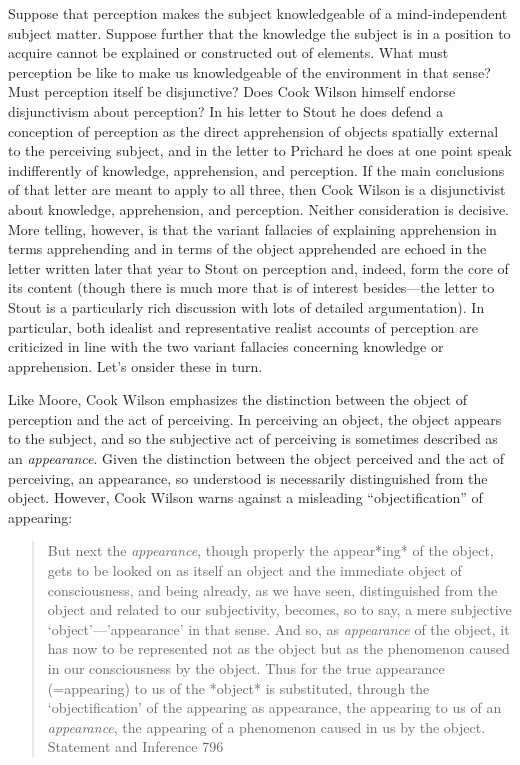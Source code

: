 \documentclass[11pt]{article}
\begin{document}
Suppose that perception makes the subject knowledgeable of a mind-independent subject matter. Suppose further that the knowledge the subject is in a position to acquire cannot be explained or constructed out of elements. What must perception be like to make us knowledgeable of the environment in that sense? Must perception itself be disjunctive? Does Cook Wilson himself endorse disjunctivism about perception? In his letter to Stout he does defend a conception of perception as the direct apprehension of objects spatially external to the perceiving subject, and in the letter to Prichard he does at one point speak indifferently of knowledge, apprehension, and perception. If the main conclusions of that letter are meant to apply to all three, then Cook Wilson is a disjunctivist about knowledge, apprehension, and perception. Neither consideration is decisive. More telling, however, is that the variant fallacies of explaining apprehension in terms apprehending and in terms of the object apprehended are echoed in the letter written later that year to Stout on perception and, indeed, form the core of its content (though there is much more that is of interest besides---the letter to Stout is a particularly rich discussion with lots of detailed argumentation). In particular, both idealist and representative realist accounts of perception are criticized in line with the two variant fallacies concerning knowledge or apprehension. Let's onsider these in turn.

Like Moore, Cook Wilson emphasizes the distinction between the object of perception and the act of perceiving. In perceiving an object, the object appears to the subject, and so the subjective act of perceiving is sometimes described as an \emph{appearance}. Given the distinction between the object perceived and the act of perceiving, an appearance, so understood is necessarily distinguished from the object. However, Cook Wilson warns against a misleading ``objectification'' of appearing:
\begin{quote}
	But next the \emph{appearance}, though properly the appear*ing* of the object, gets to be looked on as itself an object and the immediate object of consciousness, and being already, as we have seen, distinguished from the object and related to our subjectivity, becomes, so to say, a mere subjective `object'---'appearance' in that sense. And so, as \emph{appearance} of the object, it has now to be represented not as the object but as the phenomenon caused in our consciousness by the object. Thus for the true appearance (=appearing) to us of the *object* is substituted, through the `objectification' of the appearing as appearance, the appearing to us of an \emph{appearance}, the appearing of a phenomenon caused in us by the object. Statement and Inference 796
\end{quote}
\end{document}
